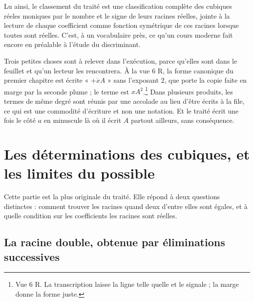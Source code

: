 \documentclass[11pt,a4paper]{article}
\begin{document}
Lu ainsi, le classement du traité est une classification complète des cubiques
réeles moniques par le nombre et le signe de leurs racines réelles, jointe à la
lecture de chaque coefficient comme fonction symétrique de ces racines lorsque
toutes sont réelles. C'est, à un vocabulaire près, ce qu'un cours moderne fait
encore en préalable à l'étude du discriminant.

Trois petites choses sont à relever dans l'exécution, parce qu'elles sont dans
le feuillet et qu'un lecteur les rencontrera. À la vue 6 R, la forme canonique
du premier chapitre est écrite « $+\dot{x}A$ » sans l'exposant 2, que porte la
copie faite en marge par la seconde plume ; le terme est $xA^2$.\footnote{Vue
6 R. La transcription laisse la ligne telle quelle et le signale ; la marge
donne la forme juste.} Dans plusieurs produits, les termes de même degré sont
réunis par une accolade au lieu d'être écrits à la file, ce qui est une
commodité d'écriture et non une notation. Et le traité écrit une fois le côté
$a$ en minuscule là où il écrit $A$ partout ailleurs, sans conséquence.

\section*{Les déterminations des cubiques, et les limites du possible}

Cette partie est la plus originale du traité. Elle répond à deux questions
distinctes : comment trouver les racines quand deux d'entre elles sont égales,
et à quelle condition sur les coefficients les racines sont réelles.

\subsection*{La racine double, obtenue par éliminations successives}
\end{document}
